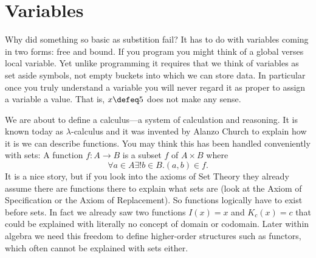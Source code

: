 \section{Variables}






Why did something so basic as substition fail?  It has to do with variables
coming in two forms: free and bound.  If you program you might think of a global
verses local variable.  Yet unlike programming it requires that we 
think of variables as set aside symbols, not empty buckets into which we 
can store data.  In particular once you truly understand a variable
you will never regard it as proper to assign a variable a value.  That is,
$x\defeq 5$ does not make any sense.

We are about to define a calculus---a system of calculation and reasoning.
It is known today as $\lambda$-calculus and it was invented by Alanzo Church 
to explain how it is we can describe functions.  You may think this has been 
handled conveniently with sets: A function $f:A\to B$ is a subset $f$ of $A\times B$ where 
\[
    \forall a\in A\exists! b\in B.(a,b)\in f.
\]
It is a nice story, but if you look into the axioms of Set Theory they already
assume there are functions there to explain what sets are (look at the Axiom of
Specification or the Axiom of Replacement). So functions logically have to exist
before sets.  In fact we already saw two functions $I(x)=x$ and $K_c(x)=c$ that
could be explained with literally no concept of domain or codomain.  Later
within algebra we need this freedom to define higher-order structures such as
functors, which often cannot be explained with sets either.


